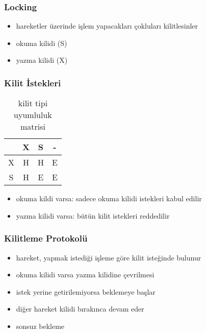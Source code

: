 \documentclass[dvipsnames]{beamer}
\theoremstyle{plain}
\begin{document}
\begin{frame}
  \frametitle{Locking}

  \begin{itemize}
    \item hareketler üzerinde işlem yapacakları çokluları kilitlesinler

    \medskip
    \item \alert{okuma} kilidi (S)
    \item \alert{yazma} kilidi (X)
  \end{itemize}
\end{frame}

%
%
%
\begin{frame}
  \frametitle{Kilit İstekleri}

    \begin{table}
      \caption{kilit tipi uyumluluk matrisi}
      \begin{tabular}{|c||c|c|c|}\hline
  & X & S & -\\\hline\hline
X & H & H & E\\\hline
S & H & E & E\\\hline
      \end{tabular}
    \end{table}
    
     \medskip
  \begin{itemize}
    \item okuma kildi varsa: sadece okuma kilidi istekleri kabul edilir
    \item yazma kilidi varsa: bütün kilit istekleri reddedilir
  \end{itemize}
\end{frame}

\begin{frame}
  \frametitle{Kilitleme Protokolü}

  \begin{itemize}
    \item hareket, yapmak istediği işleme göre kilit isteğinde bulunur
    \item okuma kilidi varsa yazma kilidine çevrilmesi

    \medskip
    \item istek yerine getirilemiyorsa beklemeye başlar
    \item diğer hareket kilidi bırakınca devam eder
    
    \medskip
    \item \alert{sonsuz bekleme}
  \end{itemize}
\end{frame}
\end{document}
